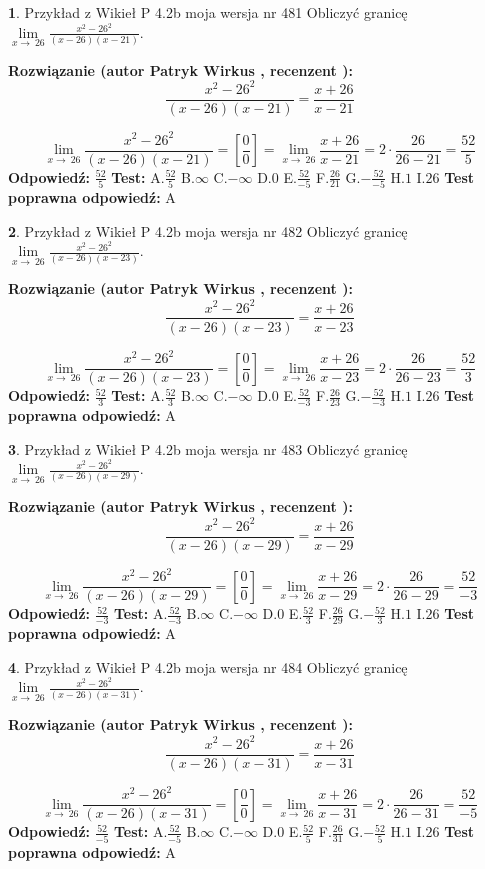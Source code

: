 \documentclass[12pt, a4paper]{article}
\theoremstyle{definition} %
\newtheorem{zad}{}
\newcommand{\zadStart}[1]{\begin{zad}#1\newline}
\newcommand{\zadStop}{\end{zad}}
\newcommand{\rozwStart}[2]{\noindent \textbf{Rozwiązanie (autor #1 , recenzent #2): }\newline}
\newcommand{\rozwStop}{\newline}
\newcommand{\odpStart}{\noindent \textbf{Odpowiedź:}\newline}
\newcommand{\odpStop}{\newline}
\newcommand{\testStart}{\noindent \textbf{Test:}\newline}
\newcommand{\testStop}{\newline}
\newcommand{\kluczStart}{\noindent \textbf{Test poprawna odpowiedź:}\newline}
\newcommand{\kluczStop}{\newline}
\begin{document}
\zadStart{Przykład z Wikieł P 4.2b moja wersja nr 481}
Obliczyć granicę $\lim\limits_{x\to\ 26}\frac{x^{2}-26^{2}}{(x-26)(x-21)}$.
\zadStop
\rozwStart{Patryk Wirkus}{}
$$\frac{x^{2}-26^{2}}{(x-26)(x-21)}=\frac{x+26}{x-21}$$

$$\lim\limits_{x\to\ 26}\frac{x^{2}-26^{2}}{(x-26)(x-21)}=[\frac{0}{0}]=\lim\limits_{x\to\ 26}\frac{x+26}{x-21}=2 \cdot \frac{26}{26-21} = \frac{52}{5}$$
\rozwStop
\odpStart
$\frac{52}{5}$
\odpStop
\testStart
A.$\frac{52}{5}$
B.$\infty$
C.$-\infty$
D.$0$
E.$\frac{52}{-5}$
F.$\frac{26}{21}$
G.$-\frac{52}{-5}$
H.$1$
I.$26$
\testStop
\kluczStart
A
\kluczStop



\zadStart{Przykład z Wikieł P 4.2b moja wersja nr 482}
Obliczyć granicę $\lim\limits_{x\to\ 26}\frac{x^{2}-26^{2}}{(x-26)(x-23)}$.
\zadStop
\rozwStart{Patryk Wirkus}{}
$$\frac{x^{2}-26^{2}}{(x-26)(x-23)}=\frac{x+26}{x-23}$$

$$\lim\limits_{x\to\ 26}\frac{x^{2}-26^{2}}{(x-26)(x-23)}=[\frac{0}{0}]=\lim\limits_{x\to\ 26}\frac{x+26}{x-23}=2 \cdot \frac{26}{26-23} = \frac{52}{3}$$
\rozwStop
\odpStart
$\frac{52}{3}$
\odpStop
\testStart
A.$\frac{52}{3}$
B.$\infty$
C.$-\infty$
D.$0$
E.$\frac{52}{-3}$
F.$\frac{26}{23}$
G.$-\frac{52}{-3}$
H.$1$
I.$26$
\testStop
\kluczStart
A
\kluczStop



\zadStart{Przykład z Wikieł P 4.2b moja wersja nr 483}
Obliczyć granicę $\lim\limits_{x\to\ 26}\frac{x^{2}-26^{2}}{(x-26)(x-29)}$.
\zadStop
\rozwStart{Patryk Wirkus}{}
$$\frac{x^{2}-26^{2}}{(x-26)(x-29)}=\frac{x+26}{x-29}$$

$$\lim\limits_{x\to\ 26}\frac{x^{2}-26^{2}}{(x-26)(x-29)}=[\frac{0}{0}]=\lim\limits_{x\to\ 26}\frac{x+26}{x-29}=2 \cdot \frac{26}{26-29} = \frac{52}{-3}$$
\rozwStop
\odpStart
$\frac{52}{-3}$
\odpStop
\testStart
A.$\frac{52}{-3}$
B.$\infty$
C.$-\infty$
D.$0$
E.$\frac{52}{3}$
F.$\frac{26}{29}$
G.$-\frac{52}{3}$
H.$1$
I.$26$
\testStop
\kluczStart
A
\kluczStop



\zadStart{Przykład z Wikieł P 4.2b moja wersja nr 484}
Obliczyć granicę $\lim\limits_{x\to\ 26}\frac{x^{2}-26^{2}}{(x-26)(x-31)}$.
\zadStop
\rozwStart{Patryk Wirkus}{}
$$\frac{x^{2}-26^{2}}{(x-26)(x-31)}=\frac{x+26}{x-31}$$

$$\lim\limits_{x\to\ 26}\frac{x^{2}-26^{2}}{(x-26)(x-31)}=[\frac{0}{0}]=\lim\limits_{x\to\ 26}\frac{x+26}{x-31}=2 \cdot \frac{26}{26-31} = \frac{52}{-5}$$
\rozwStop
\odpStart
$\frac{52}{-5}$
\odpStop
\testStart
A.$\frac{52}{-5}$
B.$\infty$
C.$-\infty$
D.$0$
E.$\frac{52}{5}$
F.$\frac{26}{31}$
G.$-\frac{52}{5}$
H.$1$
I.$26$
\testStop
\kluczStart
A
\kluczStop
\end{document}
